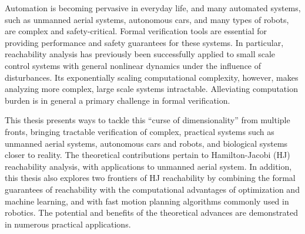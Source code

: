 \documentclass[12pt, oneside, final]{lib/ucthesis}
\begin{document}
\begin{frontmatter} 
\maketitle
\copyrightpage
\abstract
Automation is becoming pervasive in everyday life, and many automated systems, such as unmanned aerial systems, autonomous cars, and many types of robots, are complex and safety-critical. Formal verification tools are essential for providing performance and safety guarantees for these systems. In particular, reachability analysis has previously been successfully applied to small scale control systems with general nonlinear dynamics under the influence of disturbances. Its exponentially scaling computational complexity, however, makes analyzing more complex, large scale systems intractable. Alleviating computation burden is in general a primary challenge in formal verification.

This thesis presents ways to tackle this ``curse of dimensionality'' from multiple fronts, bringing tractable verification of complex, practical systems such as unmanned aerial systems, autonomous cars and robots, and biological systems closer to reality. The theoretical contributions pertain to Hamilton-Jacobi (HJ) reachability analysis, with applications to unmanned aerial system. In addition, this thesis also explores two frontiers of HJ reachability by combining the formal guarantees of reachability with the computational advantages of optimization and machine learning, and with fast motion planning algorithms commonly used in robotics. The potential and benefits of the theoretical advances are demonstrated in numerous practical applications.

\endabstract

\end{frontmatter}
\begin{optionalFrontMatter}
%
\end{optionalFrontMatter}
\end{document}
